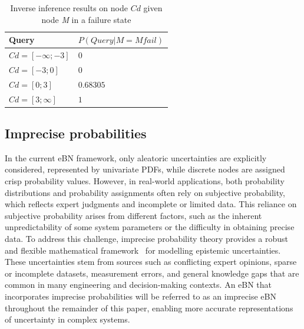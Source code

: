 \begin{table}[hbt!]
    \begin{center}
        \caption{Inverse inference results on node $Cd$ given node \textit{M} in a failure state}\label{inverse_inference_tab}
        \begin{tabular}{P{3cm}P{4cm}}
            \textbf{Query} & \textbf{$P(Query | M = M fail)$} \\
            \midrule
            $Cd = [-\infty;-3]$ & $0$ \\
            $Cd = [-3;0]$ & $0$ \\
            $Cd = [0;3]$ & $0.68305$ \\
            $Cd = [3;\infty]$ & $1$ \\
        \end{tabular}
    \end{center}
\end{table}

\subsection{Imprecise probabilities}
In the current eBN framework, only aleatoric uncertainties are explicitly considered, represented by univariate PDFs, while discrete nodes are assigned crisp probability values. 
However, in real-world applications, both probability distributions and probability assignments often rely on subjective probability, which reflects expert judgments and incomplete or limited data. 
This reliance on subjective probability arises from different factors, such as the inherent unpredictability of some system parameters or the difficulty in obtaining precise data. 
To address this challenge, imprecise probability theory provides a robust and flexible mathematical framework~\cite{beer_imprecise_2013-1} for modelling epistemic uncertainties. 
These uncertainties stem from sources such as conflicting expert opinions, sparse or incomplete datasets, measurement errors, and general knowledge gaps that are common in many engineering and decision-making contexts. 
An eBN that incorporates imprecise probabilities will be referred to as an imprecise eBN throughout the remainder of this paper, enabling more accurate representations of uncertainty in complex systems.

